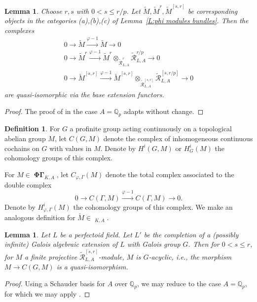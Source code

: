 \documentclass[12pt]{amsart}
\newtheorem{lemma}[theorem]{Lemma}
\theoremstyle{definition}
\newtheorem{defn}[theorem]{Definition}
\numberwithin{equation}{theorem}
\newcommand{\QQ}{\mathbb{Q}}
\newcommand{\calR}{\mathcal{R}}
\DeclareMathOperator{\PhiGamma}{\mathbf{\Phi \Gamma}}
\DeclareMathOperator{\PhiGammatilde}{\widetilde{\mathbf{\Phi \Gamma}}}
\begin{document}
\begin{lemma} \label{L:truncate cohomology}
Choose $r,s$ with $0 < s \leq r/p$. Let $\tilde{M}, \tilde{M}^r, \tilde{M}^{[s,r]}$
be corresponding objects in the categories (a),(b),(c) of Lemma~\ref{L:phi modules bundles}.
Then the complexes
\begin{gather*}
0 \to \tilde{M} \stackrel{\varphi-1}{\to} \tilde{M} \to 0 \\
0 \to \tilde{M}^r \stackrel{\varphi-1}{\to} \tilde{M}^r \otimes_{\tilde{\calR}^r_{L,A}} \tilde{\calR}^{r/p}_{L,A} \to 0 \\
0 \to \tilde{M}^{[s,r]} \stackrel{\varphi-1}{\to} \tilde{M}^{[s,r]} \otimes_{\tilde{\calR}^{[s,r]}_{L,A}} \tilde{\calR}^{[s,r/p]}_{L,A} \to 0
\end{gather*}
are quasi-isomorphic via the base extension functors.
\end{lemma}
\begin{proof}
The proof of \cite[Proposition~6.3.19]{kedlaya-liu1} in the case $A = \QQ_p$ adapts without change.
\end{proof}

\begin{defn}
For $G$ a profinite group acting continuously on a topological abelian group $M$,
let $C(G,M)$ denote the complex of inhomogeneous continuous cochains on $G$ with values in $M$. Denote by $H^i(G,M)$ or $H^i_G(M)$ the cohomology groups of this complex.

For $M \in \PhiGamma_{K,A}$, let $C_{\varphi, \Gamma}(M)$ denote the total complex associated to the double complex
\[
0 \to C(\Gamma, M) \stackrel{\varphi-1}{\to} C(\Gamma,M) \to 0.
\]
Denote by $H^i_{\varphi, \Gamma}(M)$ the cohomology groups of this complex.
We make an analogous definition for $\tilde{M} \in \PhiGammatilde_{K,A}$.
\end{defn}

\begin{lemma} \label{L:perfect descend cohomology}
Let $L$ be a perfectoid field.
Let $L'$ be the completion of a (possibly infinite) Galois algebraic extension of $L$ with Galois group $G$. Then for $0 < s \leq r$, for $M$ a finite projective $\tilde{\calR}^{[s,r]}_{L,A}$-module, $M$ is $G$-acyclic, i.e.,
the morphism $M \to C(G,M)$ is a quasi-isomorphism.
\end{lemma}
\begin{proof}
Using a Schauder basis for $A$ over $\QQ_p$, we may reduce to the case $A = \QQ_p$,
for which we may apply \cite[Theorem~8.2.22]{kedlaya-liu1}.
\end{proof}
\end{document}
